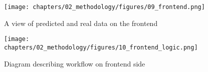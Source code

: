 \begin{figure}[H]
    \centering
    \texttt{[image: chapters/02\_methodology/figures/09\_frontend.png]}
    \caption{A view of predicted and real data on the frontend}
    \label{fig:frontend-filters}
\end{figure}

\begin{figure}[H]
    \centering
    \texttt{[image: chapters/02\_methodology/figures/10\_frontend\_logic.png]}
    \caption{Diagram describing workflow on frontend side}
    \label{fig:frontend-logic}
\end{figure}